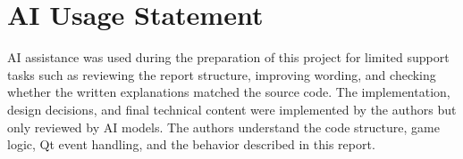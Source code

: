 \documentclass[a4paper,12pt]{article}
\begin{document}
\section*{AI Usage Statement}

AI assistance was used during the preparation of this project for limited support tasks such as reviewing the report structure, improving wording, and checking whether the written explanations matched the source code. The implementation, design decisions, and final technical content were implemented by the authors but only reviewed by AI models. The authors understand the code structure, game logic, Qt event handling, and the behavior described in this report.
\end{document}
